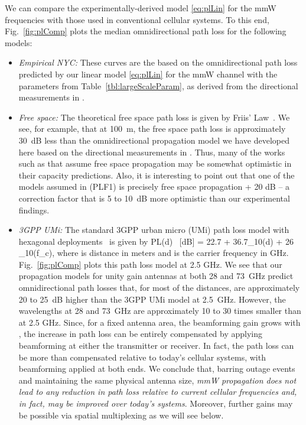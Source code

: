 \documentclass[journal]{IEEEtran}
\def\beq{}
\begin{document}
We can compare the experimentally-derived model \eqref{eq:plLin} for the
mmW frequencies with those used in conventional cellular systems.
To this end, Fig.~\ref{fig:plComp} plots the median
omnidirectional path loss for the following models:
\begin{itemize}
\item \emph{Empirical NYC:}  These curves are the based on the omnidirectional
path loss predicted by our linear model \eqref{eq:plLin} for the mmW channel
with the parameters from Table~\ref{tbl:largeScaleParam},
as derived from the directional measurements in \cite{rappaportmillimeter}.

\item \emph{Free space:}  The theoretical free space path loss is
given by Friis' Law~\cite{Rappaport:02}.
We see, for example, that at  100~m, the
free space path loss is approximately 30~dB
less than the omnidirectional propagation model we have
developed here based on the directional measurements in \cite{rappaportmillimeter}.
Thus, many of the works such as
\cite{ZhangMadhow1,AkoumAyaHeath:12,PietBRPC:12}
that assume free space propagation may be somewhat optimistic in
their capacity predictions.
Also, it is interesting to point out that
one of the models assumed in  \cite{KhanPi:11}
(PLF1) is precisely free space propagation + 20 dB -- a correction factor
that is 5 to 10~dB more optimistic than our experimental findings.

\item \emph{3GPP UMi:}  The standard 3GPP urban micro (UMi) path loss
model with
hexagonal deployments~\cite{3GPP36.814} is given by
\beq \label{eq:UMiPL}
    PL(d) \mbox{ [dB]} = 22.7 + 36.7\log_{10}(d) + 26 \log_{10}(f_c),
\eeq
where  is distance in meters and  is the carrier frequency in GHz.
Fig.~\ref{fig:plComp} plots this path loss model at  2.5 GHz.
We see that our propagation models for unity gain antennas
at both 28 and 73~GHz predict
omnidirectional path losses that, for most of the distances,
are approximately 20 to 25~dB higher than the 3GPP UMi model at 2.5~GHz.
However, the wavelengths at 28 and 73~GHz are approximately 10 to 30
times smaller than at 2.5 GHz. Since, for a fixed antenna area,
the beamforming gain grows with ,
the increase in path loss can be entirely compensated
by applying beamforming at either the transmitter or receiver.
In fact, the path loss can be more than compensated relative to today's cellular systems,
with beamforming applied at both ends.
We conclude that, barring outage events and maintaining the same
physical antenna size, \emph{mmW propagation does not lead to any reduction
in path loss relative to current cellular frequencies and, in fact, may
be improved over today's systems}.
Moreover, further gains may be possible via spatial multiplexing
as we will see below.
\end{itemize}
\end{document}
